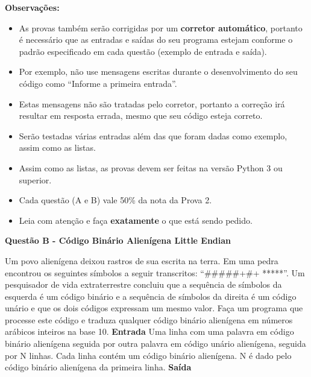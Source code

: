 \documentclass[a4paper, 12pt]{article}
\begin{document}
\textbf{{\large Observações:}}
\begin{itemize}
	\item As provas também serão corrigidas por um \textbf{corretor automático}, portanto é necessário que as entradas e saídas do seu programa estejam conforme o padrão especificado em cada questão (exemplo de entrada e saída). \item Por exemplo, não use mensagens escritas durante o desenvolvimento do seu código como “Informe a primeira entrada”.
	\item Estas mensagens não são tratadas pelo corretor, portanto a correção irá resultar em resposta errada, mesmo que seu código esteja correto.
	\item Serão testadas várias entradas além das que foram dadas como exemplo, assim como as listas.
	\item Assim como as listas, as provas devem ser feitas na versão Python 3 ou superior.
	\item Cada questão (A e B) vale 50\% da nota da Prova 2.
	\item Leia com atenção e faça \textbf{exatamente} o que está sendo pedido.
\end{itemize}
\newpage %
\begin{center}
\textbf{{\Large Questão B - Código Binário Alienígena Little Endian}}
\end{center}
\vspace{5pt}
Um povo alienígena deixou rastros de sua escrita na terra. Em uma pedra encontrou os seguintes
símbolos a seguir transcritos: “#####+#+ *****”. Um pesquisador de vida extraterrestre concluiu que a sequência de símbolos da esquerda é um código binário e a sequência de
símbolos da direita é um código unário e que os dois códigos expressam um mesmo valor.
\newline Faça um programa que processe este código e traduza qualquer código binário alienígena em
números arábicos inteiros na base 10.
\newline \newline
\textbf{{\large Entrada}} \newline
Uma linha com uma palavra em código binário alienígena seguida por outra palavra em código unário alienígena, seguida por N linhas.
\newline Cada linha contém um código binário alienígena. N é dado pelo código binário alienígena da primeira linha.
\newline \newline
\textbf{{\large Saída}} \newline
\end{document}
